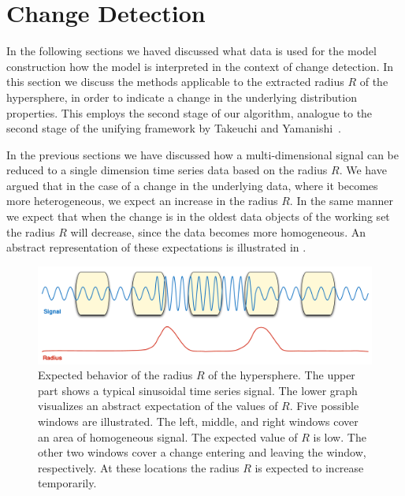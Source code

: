 \section{Change Detection}\label{sec:method_change_detection}
In the following sections we haved discussed what data is used for the model construction how the model is interpreted in the context of change detection.
In this section we discuss the methods applicable to the extracted radius $R$ of the hypersphere, in order to indicate a change in the underlying distribution properties.
This employs the second stage of our algorithm, analogue to the second stage of the unifying framework by Takeuchi and Yamanishi~\cite{takeuchi2006unifying}.

In the previous sections we have discussed how a multi-dimensional signal can be reduced to a single dimension time series data based on the radius $R$.
We have argued that in the case of a change in the underlying data, where it becomes more heterogeneous, we expect an increase in the radius $R$.
In the same manner we expect that when the change is in the oldest data objects of the working set the radius $R$ will decrease, since the data becomes more homogeneous.
An abstract representation of these expectations is illustrated in .

\begin{figure}
  \centering
    \includegraphics[width=\textwidth,height=\textheight,keepaspectratio]{./Figures/chapter4/expected_behaviour.pdf}
  \caption[Expected radius behavior]{Expected behavior of the radius $R$ of the hypersphere. The upper part shows a typical sinusoidal time series signal. The lower graph visualizes an abstract expectation of the values of $R$. Five possible windows are illustrated. The left, middle, and right windows cover an area of homogeneous signal. The expected value of $R$ is low. The other two windows cover a change entering and leaving the window, respectively. At these locations the radius $R$ is expected to increase temporarily.}
  \label{fig:radius_expectation}
\end{figure}

